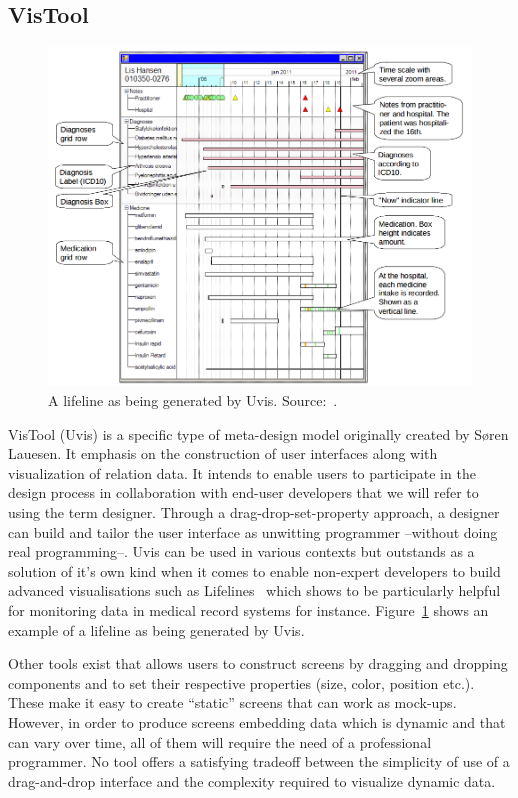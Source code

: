 \subsection{VisTool}

\begin{figure}
    \centering
    \includegraphics[width=1\textwidth]{images/lifeline.png}
    \caption{A lifeline as being generated by Uvis. Source:~\cite{lauesen2012}.}
    \label{img:lifeline}
\end{figure}

VisTool (Uvis) is a specific type of meta-design model originally created by Søren Lauesen. It emphasis on the construction of user interfaces along with visualization of relation data. It intends to enable users to participate in the design process in collaboration with end-user developers that we will refer to using the term designer. Through a drag-drop-set-property approach, a designer can build and tailor the user interface as unwitting programmer\cite{Costabile2008} --without doing real programming--. Uvis can be used in various contexts but outstands as a solution of it's own kind when it comes to enable non-expert developers to build advanced visualisations such as Lifelines~\cite{Plaisant1998} which shows to be particularly helpful for monitoring data in medical record systems for instance. Figure~\ref{img:lifeline} shows an example of a lifeline as being generated by Uvis.

Other tools exist that allows users to construct screens by dragging and dropping components and to set their respective properties (size, color, position etc.). These make it easy to create ``static'' screens that can work as mock-ups. However, in order to produce screens embedding data which is dynamic and that can vary over time, all of them will require the need of a professional programmer. No tool offers a satisfying tradeoff between the simplicity of use of a drag-and-drop interface and the complexity required to visualize dynamic data.

